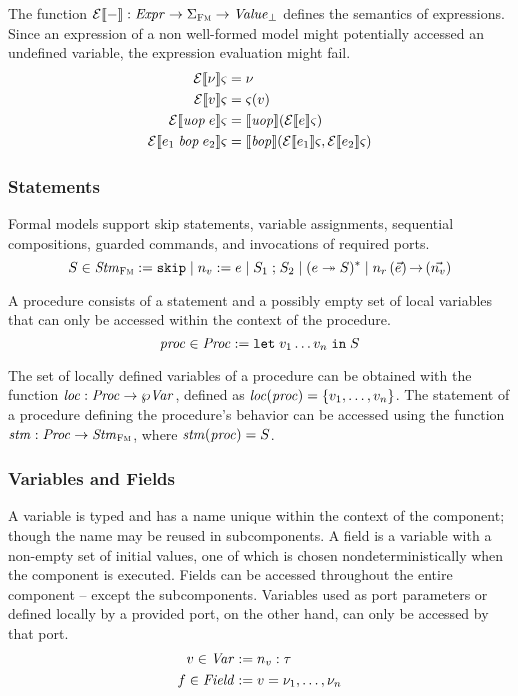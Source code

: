 \documentclass[a4paper,10pt,english]{article}
\begin{document}
The function $\mathcal{E} \llbracket - \rrbracket : \mathit{Expr} \rightarrow \Sigma_\textsc{Fm} \rightarrow \mathit{Value}_\bot$ defines the
semantics of expressions. Since an expression of a non well-formed model might potentially accessed an undefined variable, the expression
evaluation might fail. 
\begin{align*}
	\mathcal{E} \llbracket \nu \rrbracket \varsigma &= \nu \\
	\mathcal{E} \llbracket v \rrbracket \varsigma &= \varsigma(v) \\
	\mathcal{E} \llbracket \mathit{uop}\; e \rrbracket \varsigma &= \llbracket \mathit{uop} \rrbracket (\mathcal{E} \llbracket e \rrbracket \varsigma)
	\\
	\mathcal{E} \llbracket e_1 \;\mathit{bop}\; e_2 \rrbracket \varsigma &= \llbracket \mathit{bop} \rrbracket
	(\mathcal{E} \llbracket e_1 \rrbracket \varsigma, \mathcal{E} \llbracket e_2 \rrbracket \varsigma)
\end{align*}

\subsubsection{Statements}
Formal models support skip statements, variable assignments, sequential compositions, guarded commands, and
invocations of required ports.
\begin{equation*}
	S \in \mathit{Stm}_\textsc{Fm} :=
		\mathtt{skip} \mid 
		n_v\; \mathtt{:=}\; e \mid
		S_1 \; \mathtt{;} \; S_2 \mid
		(e \; \mathtt{\twoheadrightarrow} \; S)^* \mid
		n_r \left( \vec{e} \right) \mathtt{\rightarrow} \left( \vec{n_v} \right)
\end{equation*}

A procedure consists of a statement and a possibly empty set of local variables that can only be accessed within the context
of the procedure.
\begin{equation*}
	\mathit{proc} \in \mathit{Proc} := \mathtt{let} \; v_1 \ldots v_n \; \mathtt{in} \; S
\end{equation*}

The set of locally defined variables of a procedure can be obtained
with the function $\mathit{loc} : \mathit{Proc} \rightarrow
\wp \mathit{Var}$, defined as $\mathit{loc}(\mathit{proc}) = \{v_1, \ldots, v_n\}$. The statement of a
procedure defining the procedure's behavior can be accessed using the function $\mathit{stm} : \mathit{Proc} \rightarrow \mathit{Stm}_\textsc{Fm}$, where
$\mathit{stm}(\mathit{proc}) = S$.

\subsubsection{Variables and Fields}
A variable is typed and has a name unique within the context of the component; though the name may be reused in subcomponents.
A field is a variable with a non-empty set of initial values, one of which is chosen nondeterministically when
the component is executed. Fields can be accessed throughout the entire component -- except the subcomponents. Variables used as
port parameters or defined locally by a provided port, on the other hand, can only be accessed by that port. 
\begin{align*}
	v \in \mathit{Var} &:= n_v \; \mathtt{:} \; \tau \\
	f \in \mathit{Field} &:= v \; \mathtt{=} \; \nu_1, \ldots, \nu_n
\end{align*}
\end{document}
